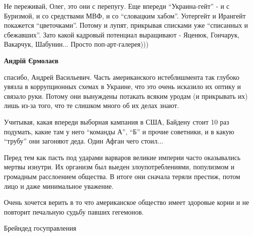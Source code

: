  
 
 
 
 
\zzSecCmt

\begin{itemize} %

Не переживай, Олег, это они с перепугу. Еще впереди \enquote{Украина-гейт} - и с
Буризмой, и со средствами МВФ, и со \enquote{словацким хабом}. Уотергейт и Ирангейт
покажется \enquote{цветочками}. Потому и лупят, прикрывая списками уже \enquote{списанных и
сбежавших}. Зато какой кадровый потенциал выращивают - Яценюк, Гончарук,
Вакарчук, Шабунин... Просто поп-арт-галерея)))

\begin{itemize} %
\textbf{Андрій Єрмолаєв} 

спасибо, Андрей Васильевич. Часть американского истеблишмента так глубоко
увязла в коррупционных схемах в Украине, что это очень исказило их оптику и
связало руки. Потому они вынуждены потакать всяким уродам (и прикрывать их)
лишь из-за того, что те слишком много об их делах знают.



Учитывая, какая впереди выборная кампания в США, Байдену стоит 10 раз подумать,
какие там у него \enquote{команды А}, \enquote{Б} и прочие советники, и в какую \enquote{трубу} они
загоняют деда. Один Афган чего стоил...

\end{itemize} %


Перед тем как пасть под ударами варваров великие империи часто оказывались
мертвы изнутри. Их организм был выеден злоупотреблениями, популизмом и
громадным расслоением общества. В итоге они сначала теряли престиж, потом лицо
и даже минимальное уважение.

Очень хочется верить в то что американское общество имеет здоровые корни и не
повторит печальную судьбу павших гегемонов.


Брейндед госуправления



\end{itemize}

